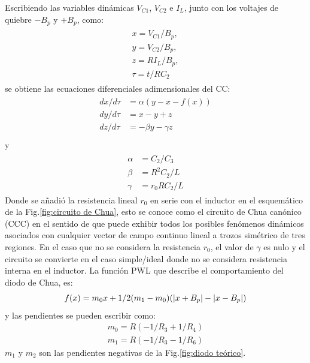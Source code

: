 \documentclass{rbf}
\begin{document}
Escribiendo las variables dinámicas $V_{C1}$, $V_{C2}$ e $I_L$, junto con los voltajes de quiebre $-B_{p}$ y $+B_{p}$, como:
\begin{eqnarray}\label{x y z adimensionales}
    \begin{split}
        x=V_{C1}/B_p,\\
        y=V_{C2}/B_p, \\
        z=RI_L/B_p, \\
        \tau=t/RC_2
    \end{split}
\end{eqnarray}
se obtiene las ecuaciones diferenciales adimensionales del CC:
\begin{eqnarray}\label{Chua eq dif}
    \begin{split}
    dx/d\tau &= \alpha(y - x - f(x))\\
    dy/d\tau &= x-y+z\\
    dz/d\tau &= -\beta y -\gamma z\\ 
    \end{split}
\end{eqnarray}
y
\begin{eqnarray}\label{alfa beta gamma}
\begin{split}
    \alpha&=C_{2}/C_{3}\\
    \beta&=R^{2}C_2/L\\
    \gamma&=r_{0}RC_{2}/L
\end{split}
\end{eqnarray}
Donde se añadió la resistencia lineal $r_0$ en serie con el inductor en el esquemático de la Fig.\ref{fig:circuito de Chua}, esto se conoce como el circuito de Chua canónico (CCC) en el sentido de que puede exhibir todos los posibles fenómenos dinámicos asociados con cualquier vector de campo continuo lineal a trozos simétrico de tres regiones. En el caso que no se considera la resistencia $r_0$, el valor de $\gamma$ es nulo y el circuito se convierte en el caso simple/ideal donde no se considera resistencia interna en el inductor. 
La función PWL que describe el comportamiento del diodo de Chua, es:
\begin{equation} \label{f(x) PWL}
    f(x) = m_{0}x + 1/2(m_{1}-m_{0})(|x+B_p|- |x-B_p|)\\
\end{equation}
y las pendientes se pueden escribir como:
\begin{eqnarray}\label{pendientes}
        m_0=R(-1/R_3 +1/R_4)\\
        m_1=R(-1/R_3 -1/R_6)
\end{eqnarray}
$m_{1}$ y $m_{2}$ son las pendientes negativas de la Fig.\ref{fig:diodo teórico}.
\end{document}
